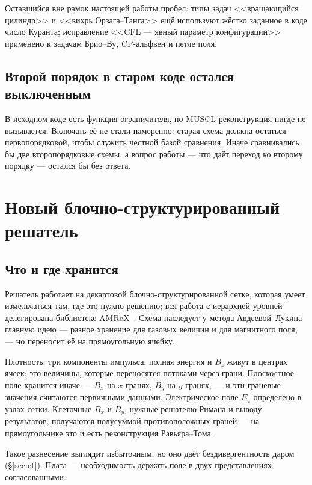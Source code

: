 \documentclass[12pt,a4paper]{article}
\begin{document}
Оставшийся вне рамок настоящей работы пробел: типы задач <<вращающийся
цилиндр>> и <<вихрь Орзага--Танга>> ещё используют жёстко заданное в коде число
Куранта; исправление <<CFL --- явный параметр конфигурации>> применено к
задачам Брио--Ву, CP-альфвен и петле поля.

\subsection{Второй порядок в старом коде остался выключенным}

В исходном коде есть функция ограничителя, но MUSCL-реконструкция нигде не
вызывается. Включать её не стали намеренно: старая схема должна остаться
первопорядковой, чтобы служить честной базой сравнения. Иначе сравнивались бы
две второпорядковые схемы, а вопрос работы --- что даёт переход ко второму
порядку --- остался бы без ответа.

\section{Новый блочно-структурированный решатель}
\label{sec:new}

\subsection{Что и где хранится}

Решатель работает на декартовой блочно-структурированной сетке, которая умеет
измельчаться там, где это нужно решению; вся работа с иерархией уровней делегирована
библиотеке AMReX~\cite{amrex}. Схема наследует у метода Авдеевой--Лукина главную
идею — разное хранение для газовых величин и для магнитного поля, — но переносит
её на прямоугольную ячейку.

Плотность, три компоненты импульса, полная энергия и $B_z$ живут в центрах ячеек:
это величины, которые переносятся потоками через грани. Плоскостное поле хранится
иначе — $B_x$ на $x$-гранях, $B_y$ на $y$-гранях, — и эти граневые значения
считаются первичными данными. Электрическое поле $E_z$ определено в узлах сетки.
Клеточные $B_x$ и $B_y$, нужные решателю Римана и выводу результатов, получаются
полусуммой противоположных граней — на прямоугольнике это и есть реконструкция
Равьяра--Тома.

Такое разнесение выглядит избыточным, но оно даёт бездивергентность
даром (\S\ref{sec:ct}). Плата — необходимость держать поле в двух
представлениях согласованными.
\end{document}
